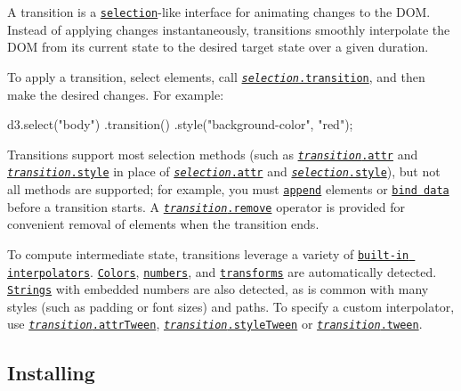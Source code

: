 A transition is a \href{https://github.com/d3/d3-selection}{\tt selection}-\/like interface for animating changes to the D\+OM. Instead of applying changes instantaneously, transitions smoothly interpolate the D\+OM from its current state to the desired target state over a given duration.

To apply a transition, select elements, call \href{#selection_transition}{\tt {\itshape selection}.transition}, and then make the desired changes. For example\+:


\begin{DoxyCode}
d3.select("body")
  .transition()
    .style("background-color", "red");
\end{DoxyCode}


Transitions support most selection methods (such as \href{#transition_attr}{\tt {\itshape transition}.attr} and \href{#transition_style}{\tt {\itshape transition}.style} in place of \href{https://github.com/d3/d3-selection#selection_attr}{\tt {\itshape selection}.attr} and \href{https://github.com/d3/d3-selection#selection_style}{\tt {\itshape selection}.style}), but not all methods are supported; for example, you must \href{https://github.com/d3/d3-selection#selection_append}{\tt append} elements or \href{https://github.com/d3/d3-selection#joining-data}{\tt bind data} before a transition starts. A \href{#transition_remove}{\tt {\itshape transition}.remove} operator is provided for convenient removal of elements when the transition ends.

To compute intermediate state, transitions leverage a variety of \href{https://github.com/d3/d3-interpolate}{\tt built-\/in interpolators}. \href{https://github.com/d3/d3-interpolate#interpolateRgb}{\tt Colors}, \href{https://github.com/d3/d3-interpolate#interpolateNumber}{\tt numbers}, and \href{https://github.com/d3/d3-interpolate#interpolateTransform}{\tt transforms} are automatically detected. \href{https://github.com/d3/d3-interpolate#interpolateString}{\tt Strings} with embedded numbers are also detected, as is common with many styles (such as padding or font sizes) and paths. To specify a custom interpolator, use \href{#transition_attrTween}{\tt {\itshape transition}.attr\+Tween}, \href{#transition_styleTween}{\tt {\itshape transition}.style\+Tween} or \href{#transition_tween}{\tt {\itshape transition}.tween}.

\subsection*{Installing}


